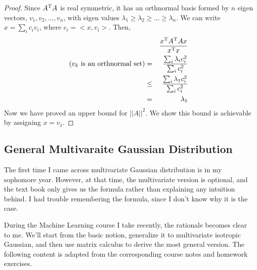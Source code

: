 \begin{proof}
Since $A^\mathrm{T}A$ is real symmetric, it has an orthnormal basis 
formed by $n$ eigen vectors, $v_1, v_2, \dots, v_n$, with 
eigen values $\lambda_1 \ge \lambda_2 \ge \dots \ge \lambda_n$. We can 
write $x=\sum_{i}{c_iv_i}$, where $c_i=<x,v_i>$. Then, 
\begin{eqnarray}
	&&\frac{x^\mathrm{T}A^\mathrm{T}Ax}{x^\mathrm{T}x} \\
	\text{($v_k$ is an orthnormal set)}&=& \frac{\sum_i \lambda_i c_i^2}{\sum_{i}{c_i^2}} \\
	&\le & \frac{\sum_i \lambda_1 c_i^2}{\sum_{i}{c_i^2}} \\
	&=& \lambda_1
\end{eqnarray}
Now we have proved an upper bound for $||A||^2$. We show this bound is achievable 
by assigning $x=v_1$. 
\end{proof}
	
	
\subsection{General Multivaraite Gaussian Distribution}	

The first time I came across multivariate Gaussian distribution 
is in my sophomore year. However, at that time, the multivariate 
version is optional, and the text book only gives us the formula 
rather than explaining any intuition behind. I had trouble 
remembering the formula, since I don't know why it is the case.

During the Machine Learning course\cite{xu2012-mlt} I take recently, 
the rationale becomes clear to me. We'll start from the basic notion, 
generalize it to multivariate isotropic Gaussian, and then 
use matrix calculus to derive the most general version. 
The following content is adapted from the corresponding course notes
and homework exercises. 

